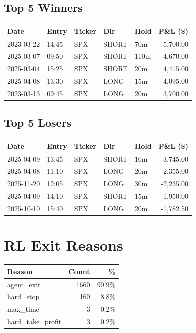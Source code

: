\documentclass[11pt,a4paper]{article}
\begin{document}
\subsection*{Top 5 Winners}
\noindent\begin{center}
\begin{tabular}{>{\color{txtmain}}l llll r}
\toprule
\rowcolor{cardbg}
\textbf{Date} & \textbf{Entry} & \textbf{Ticker} & \textbf{Dir} & \textbf{Hold} & \textbf{P\&L (\$)} \\
\midrule
2023-03-22 & 14:45 & SPX & SHORT & 70m & \textcolor{wingreen}{5,700.00} \\
2025-03-07 & 09:50 & SPX & SHORT & 110m & \textcolor{wingreen}{4,670.00} \\
2025-03-04 & 15:25 & SPX & SHORT & 20m & \textcolor{wingreen}{4,415.00} \\
2025-04-08 & 13:30 & SPX & LONG & 15m & \textcolor{wingreen}{4,095.00} \\
2023-03-13 & 09:45 & SPX & LONG & 20m & \textcolor{wingreen}{3,700.00} \\
\bottomrule
\end{tabular}
\end{center}
\subsection*{Top 5 Losers}
\noindent\begin{center}
\begin{tabular}{>{\color{txtmain}}l llll r}
\toprule
\rowcolor{cardbg}
\textbf{Date} & \textbf{Entry} & \textbf{Ticker} & \textbf{Dir} & \textbf{Hold} & \textbf{P\&L (\$)} \\
\midrule
2025-04-09 & 13:45 & SPX & SHORT & 10m & \textcolor{lossred}{-3,745.00} \\
2025-04-08 & 11:10 & SPX & LONG & 20m & \textcolor{lossred}{-2,355.00} \\
2025-11-20 & 12:05 & SPX & LONG & 30m & \textcolor{lossred}{-2,235.00} \\
2025-04-09 & 14:10 & SPX & SHORT & 15m & \textcolor{lossred}{-1,950.00} \\
2025-10-10 & 15:40 & SPX & LONG & 20m & \textcolor{lossred}{-1,782.50} \\
\bottomrule
\end{tabular}
\end{center}
\clearpage
\section*{RL Exit Reasons}
\noindent\begin{center}
\begin{tabular}{>{\color{txtmain}}l rr}
\toprule
\rowcolor{cardbg}
\textbf{Reason} & \textbf{Count} & \textbf{\%} \\
\midrule
agent\_exit & 1660 & 90.9\% \\
hard\_stop & 160 & 8.8\% \\
max\_time & 3 & 0.2\% \\
hard\_take\_profit & 3 & 0.2\% \\
\bottomrule
\end{tabular}
\end{center}
\end{document}
